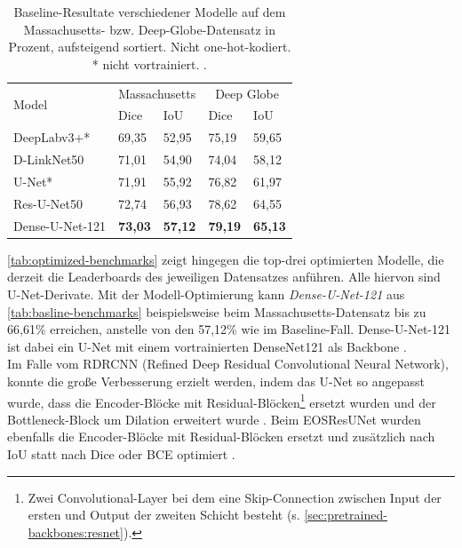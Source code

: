 \begin{table}
	\centering
	\begin{tabular}{l|l|l|l|l}
		\multirow{2}{*}{Model} & \multicolumn{2}{c|}{Massachusetts} & \multicolumn{2}{c}{Deep Globe}  \\
		& Dice & IoU & Dice & IoU \\
		\midrule
		DeepLabv3+* & 69,35 & 52,95 & 75,19 & 59,65 \\
		D-LinkNet50 & 71,01 & 54,90 & 74,04 & 58,12 \\
		U-Net* & 71,91 & 55,92 & 76,82 & 61,97 \\
		Res-U-Net50 & 72,74 & 56,93 & 78,62 & 64,55  \\
		Dense-U-Net-121 & \textbf{73,03} & \textbf{57,12} & \textbf{79,19} & \textbf{65,13}  \\
	\end{tabular}
	\caption{Baseline-Resultate verschiedener Modelle auf dem Massachusetts- 
	bzw. Deep-Globe-Datensatz in Prozent, aufsteigend sortiert. Nicht one-hot-kodiert. * nicht vortrainiert. \cite{C.Henry.2021}.}
	\label{tab:basline-benchmarks}
\end{table}

\autoref{tab:optimized-benchmarks} zeigt hingegen die top-drei optimierten Modelle, die derzeit die Leaderboards 
des jeweiligen Datensatzes anführen. Alle hiervon sind U-Net-Derivate.
Mit der Modell-Optimierung kann \textit{Dense-U-Net-121} aus \autoref{tab:basline-benchmarks} beispielsweise beim Massachusetts-Datensatz 
bis zu 66,61\% erreichen, anstelle von den 57,12\% wie im Baseline-Fall. 
Dense-U-Net-121 ist dabei ein U-Net mit einem vortrainierten DenseNet121 als Backbone \cite{C.Henry.2021}. \\
Im Falle vom RDRCNN (Refined Deep Residual Convolutional Neural Network), konnte die große Verbesserung erzielt werden,
indem das U-Net so angepasst wurde, dass die Encoder-Blöcke mit Residual-Blöcken\footnote{Zwei Convolutional-Layer bei dem eine Skip-Connection zwischen Input der ersten und Output der zweiten Schicht besteht (s. \autoref{sec:pretrained-backbones:resnet}).} 
ersetzt wurden und der Bottleneck-Block
um Dilation erweitert wurde \cite{Gao.2019}. 
Beim EOSResUNet wurden ebenfalls die Encoder-Blöcke mit Residual-Blöcken ersetzt und zusätzlich nach \ac{IoU} statt nach Dice oder \ac{BCE} optimiert \cite{O.Filin.2018}.

\newcommand*\rot{\rotatebox{60}}

